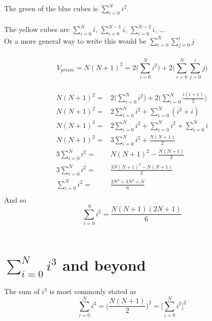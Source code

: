 The green of the blue cubes is \(\sum\limits_{i=0}^N{i^2}\).  \\
\\
The yellow cubes are \(\sum\limits_{i=0}^N{i}\), \(\sum\limits_{i=0}^{N-1}{i}\), \(\sum\limits_{i=0}^{N-2}{i}\), ...   \\
Or a more general way to write this would be \(\sum\limits_{i=0}^N{ \sum\limits_{j=0}^i{j}}\) \\
\\
\[ V_{prism} = N(N+1)^2 = 2\bigg(\sum\limits_{i=0}^N{i^2}\bigg) + 2\bigg(\sum\limits_{i=0}^N{ \sum\limits_{j=0}^i{j}} \bigg) \] \\
\begin{align*}
N(N+1)^2 =& 2\bigg(\sum\limits_{i=0}^N{i^2}\bigg) + 2\bigg(\sum\limits_{i=0}^N{ \frac{i(i+1)}{2}} \bigg) \\
N(N+1)^2 =& 2\sum\limits_{i=0}^N{i^2} + \sum\limits_{i=0}^N{ (i^2 + i)} \\
N(N+1)^2 =& 2\sum\limits_{i=0}^N{i^2} + \sum\limits_{i=0}^N{i^2 } + \sum\limits_{i=0}^N{i} \\
N(N+1)^2 =& 3\sum\limits_{i=0}^N{i^2} + \frac{N(N+1)}{2} \\
3\sum\limits_{i=0}^N{i^2} =& N(N+1)^2 - \frac{N(N+1)}{2} \\
3\sum\limits_{i=0}^N{i^2} =& \frac{3N(N+1)^2 - N(N+1)}{2} \\
\sum\limits_{i=0}^N{i^2} =& \frac{2N^3+3N^2+N}{6} \\
\end{align*}
And so
\[\sum\limits_{i=0}^N{i^2} = \frac{N(N+1)(2N+1)}{6}\] \\


\section{$\sum\limits_{i=0}^N{i^3}$ and beyond}
The sum of \(i^3\) is most commonly stated as
\[\sum\limits_{i=0}^N{i^3} = \bigg(\frac{N(N+1)}{2} \bigg)^2 = \bigg[\sum\limits_{i=0}^N{i^2} \bigg]^2\]

